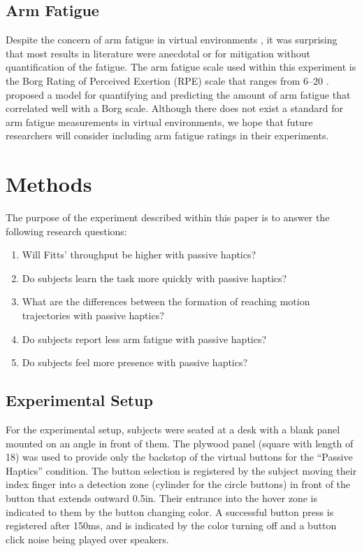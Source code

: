 \subsection{Arm Fatigue}

Despite the concern of arm fatigue in virtual environments \citep{burdea_virtual_2003}, it was surprising that most results in literature were anecdotal or for mitigation without quantification of the fatigue.
The arm fatigue scale used within this experiment is the Borg Rating of Perceived Exertion (RPE) scale that ranges from \numrange{6}{20} \citep{borg_borgs_1998}.
\citet{hincapie-ramos_consumed_2014} proposed a model for quantifying and predicting the amount of arm fatigue that correlated well with a Borg scale.
Although there does not exist a standard for arm fatigue measurements in virtual environments, we hope that future researchers will consider including arm fatigue ratings in their experiments.

\section{Methods}

The purpose of the experiment described within this paper is to answer the following research questions:

\begin{enumerate}
    \item Will Fitts' throughput be higher with passive haptics?
    \item Do subjects learn the task more quickly with passive haptics?
    \item What are the differences between the formation of reaching motion trajectories with passive haptics?
    \item Do subjects report less arm fatigue with passive haptics?
    \item Do subjects feel more presence with passive haptics?
\end{enumerate}

\subsection{Experimental Setup}

For the experimental setup, subjects were seated at a desk with a blank panel mounted on an angle in front of them.
The plywood panel (square with length of \SI{18}{\inch}) was used to provide only the backstop of the virtual buttons for the ``Passive Haptics'' condition.
The button selection is registered by the subject moving their index finger into a detection zone (cylinder for the circle buttons) in front of the button that extends outward 0.5in.
Their entrance into the hover zone is indicated to them by the button changing color.
A successful button press is registered after 150ms, and is indicated by the color turning off and a button click noise being played over speakers.

